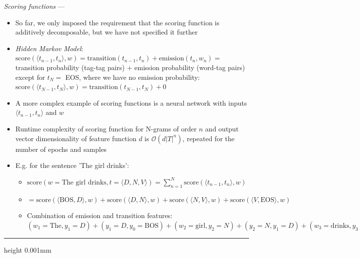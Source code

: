 \emph{Scoring functions} --- 
\begin{itemize}
    \item So far, we only imposed the requirement that the scoring function is additively decomposable, but we have not specified it further
    \item \emph{Hidden Markov Model}:
    $
    \textrm{score}(\langle t_{n-1}, t_n \rangle,w) = \textrm{transition}(t_{n-1}, t_n) + \textrm{emission}(t_n, w_n) =
    $ transition probability (tag-tag pairs) $+$ emission probability (word-tag pairs) except for $t_N =$ EOS, where we have no emission probability: $
    \textrm{score}(\langle t_{N-1}, t_N \rangle,w) = \textrm{transition}(t_{N-1}, t_N) + 0
    $
    \item A more complex example of scoring functions is a neural network with inputs $\langle t_{n-1}, t_n \rangle$ and $w$
    \item Runtime complexity of scoring function for N-grams of order $n$ and output vector dimensionality of feature function $d$ is $\mathcal{O}(d |T|^n)$, repeated for the number of epochs and samples 
    \item E.g. for the sentence 'The girl drinks':
    \begin{itemize}
        \item $\textrm{score}(w = \textrm{The girl drinks}, t = \langle D, N, V \rangle) = \sum_{n=1}^{N} \textrm{score}(\langle t_{n-1}, t_n \rangle, w)$
        \item $= \textrm{score}(\langle \textrm{BOS}, D \rangle, w) + \textrm{score}(\langle D, N \rangle, w) + \textrm{score}(\langle N, V \rangle, w) + \textrm{score}(\langle V, \textrm{EOS} \rangle, w)$
        \item Combination of emission and transition features: $(w_1 = \textrm{The}, y_1 = D) + (y_1 = D, y_0 = \textrm{BOS}) + (w_2 = \textrm{girl}, y_2 = N) + (y_2 = N, y_1 = D) + (w_3 = \textrm{drinks}, y_3 = V) + (y_3 = V, y_2 = N) + (y_4 = \textrm{EOS}, y_3 = V)$
    \end{itemize}
\end{itemize}

{\color{black}\hrule height 0.001mm}

